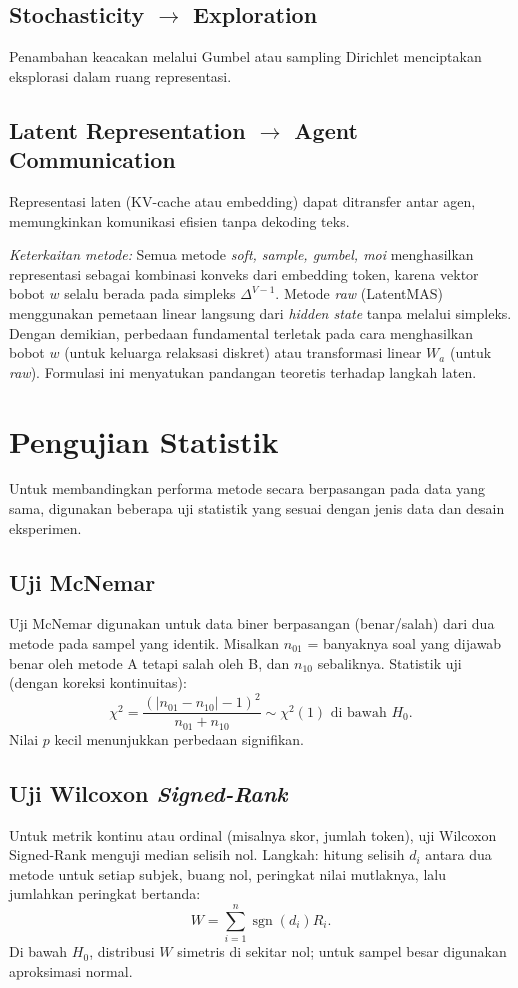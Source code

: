 \subsection{Stochasticity $\rightarrow$ Exploration}
Penambahan keacakan melalui Gumbel atau sampling Dirichlet menciptakan eksplorasi dalam ruang representasi.

\subsection{Latent Representation $\rightarrow$ Agent Communication}
Representasi laten (KV-cache atau embedding) dapat ditransfer antar agen, memungkinkan komunikasi efisien tanpa dekoding teks.

\textit{Keterkaitan metode:} Semua metode \textit{soft, sample, gumbel, moi} menghasilkan representasi sebagai kombinasi konveks dari embedding token, karena vektor bobot \(w\) selalu berada pada simpleks \(\Delta^{V-1}\). Metode \textit{raw} (LatentMAS) menggunakan pemetaan linear langsung dari \textit{hidden state} tanpa melalui simpleks. Dengan demikian, perbedaan fundamental terletak pada cara menghasilkan bobot \(w\) (untuk keluarga relaksasi diskret) atau transformasi linear \(W_a\) (untuk \textit{raw}). Formulasi ini menyatukan pandangan teoretis terhadap langkah laten.

\section{Pengujian Statistik}

Untuk membandingkan performa metode secara berpasangan pada data yang sama, digunakan beberapa uji statistik yang sesuai dengan jenis data dan desain eksperimen.

\subsection{Uji McNemar}
Uji McNemar digunakan untuk data biner berpasangan (benar/salah) dari dua metode pada sampel yang identik. Misalkan \(n_{01}\) = banyaknya soal yang dijawab benar oleh metode A tetapi salah oleh B, dan \(n_{10}\) sebaliknya. Statistik uji (dengan koreksi kontinuitas):
\begin{equation}
\chi^2 = \frac{(|n_{01} - n_{10}| - 1)^2}{n_{01} + n_{10}} \sim \chi^2(1) \text{ di bawah } H_0.
\end{equation}
Nilai \(p\) kecil menunjukkan perbedaan signifikan.

\subsection{Uji Wilcoxon \textit{Signed-Rank}}
Untuk metrik kontinu atau ordinal (misalnya skor, jumlah token), uji Wilcoxon Signed-Rank menguji median selisih nol. Langkah: hitung selisih \(d_i\) antara dua metode untuk setiap subjek, buang nol, peringkat nilai mutlaknya, lalu jumlahkan peringkat bertanda:
\begin{equation}
W = \sum_{i=1}^n \operatorname{sgn}(d_i) R_i.
\end{equation}
Di bawah \(H_0\), distribusi \(W\) simetris di sekitar nol; untuk sampel besar digunakan aproksimasi normal.

